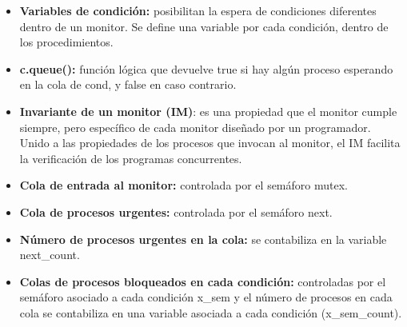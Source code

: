 \documentclass[a4paper,11pt]{article}
\begin{document}
\begin{itemize}
\item \textbf{Variables de condición:} posibilitan la espera de condiciones diferentes dentro de un monitor. Se define una variable por cada condición, dentro de los procedimientos.

\item \textbf{c.queue():} función lógica que devuelve true si hay algún proceso esperando en la cola de cond, y false en caso contrario.

\item \textbf{Invariante de un monitor (IM)}: es una propiedad que el monitor cumple siempre, pero específico de cada monitor diseñado por un programador. Unido a las propiedades de los procesos que invocan al monitor, el IM facilita la verificación de los programas concurrentes.

\item \textbf{Cola de entrada al monitor:} controlada por el semáforo mutex.

\item \textbf{Cola de procesos urgentes:} controlada por el semáforo next.

\item \textbf{Número de procesos urgentes en la cola:} se contabiliza en la variable next\_count.

\item \textbf{Colas de procesos bloqueados en cada condición:} controladas por el semáforo asociado a cada condición x\_sem y el número de procesos en cada cola se contabiliza en una variable asociada a cada condición (x\_sem\_count).
\end{itemize}
\end{document}
